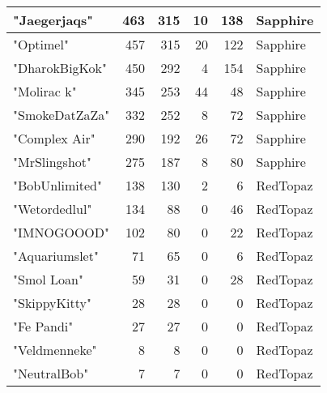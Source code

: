 \documentclass{article}
\begin{document}
\begin{table}[htbp]
\begin{tabular}{|l|r|r|r|r|l|}
"Jaegerjaqs" & 463 & 315 & 10 & 138 & Sapphire \\ \hline
"Optimel" & 457 & 315 & 20 & 122 & Sapphire \\ \hline
"DharokBigKok" & 450 & 292 & 4 & 154 & Sapphire \\ \hline
"Molirac k" & 345 & 253 & 44 & 48 & Sapphire \\ \hline
"SmokeDatZaZa" & 332 & 252 & 8 & 72 & Sapphire \\ \hline
"Complex Air" & 290 & 192 & 26 & 72 & Sapphire \\ \hline
"MrSlingshot" & 275 & 187 & 8 & 80 & Sapphire \\ \hline
"BobUnlimited" & 138 & 130 & 2 & 6 & RedTopaz \\ \hline
"Wetordedlul" & 134 & 88 & 0 & 46 & RedTopaz \\ \hline
"IMNOGOOOD" & 102 & 80 & 0 & 22 & RedTopaz \\ \hline
"Aquariumslet" & 71 & 65 & 0 & 6 & RedTopaz \\ \hline
"Smol Loan" & 59 & 31 & 0 & 28 & RedTopaz \\ \hline
"SkippyKitty" & 28 & 28 & 0 & 0 & RedTopaz \\ \hline
"Fe Pandi" & 27 & 27 & 0 & 0 & RedTopaz \\ \hline
"Veldmenneke" & 8 & 8 & 0 & 0 & RedTopaz \\ \hline
"NeutralBob" & 7 & 7 & 0 & 0 & RedTopaz \\ \hline
\end{tabular}
\end{table}
\end{document}
